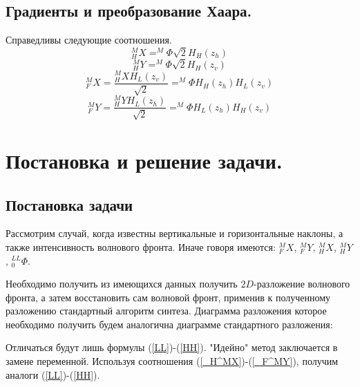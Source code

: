 \documentclass[oneside, final, 14pt]{extreport}
\begin{document}
\section{Градиенты и преобразование Хаара.}
Справедливы следующие соотношения.
\begin{equation}\label{_H^MX}
_H^MX = ^M\Phi\sqrt{2}H_H(z_h) 
\end{equation}
\begin{equation}\label{_H^MY}
_H^MY = ^M\Phi\sqrt{2}H_H(z_v)
\end{equation}
\begin{equation}\label{_F^MX}
_F^MX = \frac{_H^MX H_L(z_v)}{\sqrt{2}}=^M\Phi H_H(z_h) H_L(z_v)
\end{equation}
\begin{equation}\label{_F^MY}
_F^MY = \frac{_H^MY H_L(z_h)}{\sqrt{2}}=^M\Phi H_L(z_h) H_H(z_v)
\end{equation}
\chapter{Постановка и решение задачи.}
\section{Постановка задачи}
Рассмотрим случай, когда известны вертикальные и горизонтальные наклоны, а также интенсивность волнового фронта. Иначе говоря имеются: $_F^MX$, $_F^MY$, $_H^MX$, $_H^MY$ , $_0^{LL}\Phi$.

Необходимо получить из имеющихся данных получить $2D$-разложение волнового фронта, а затем восстановить сам волновой фронт, применив к полученному разложению стандартный алгоритм синтеза.
Диаграмма разложения которое необходимо получить будем аналогична диаграмме стандартного разложения:
\begin{center}
\end{center}
Отличаться будут лишь формулы (\ref{LL})-(\ref{HH}). "Идейно" метод заключается в замене переменной. Используя соотношения (\ref{_H^MX})-(\ref{_F^MY}), получим аналоги (\ref{LL})-(\ref{HH}).
\end{document}

